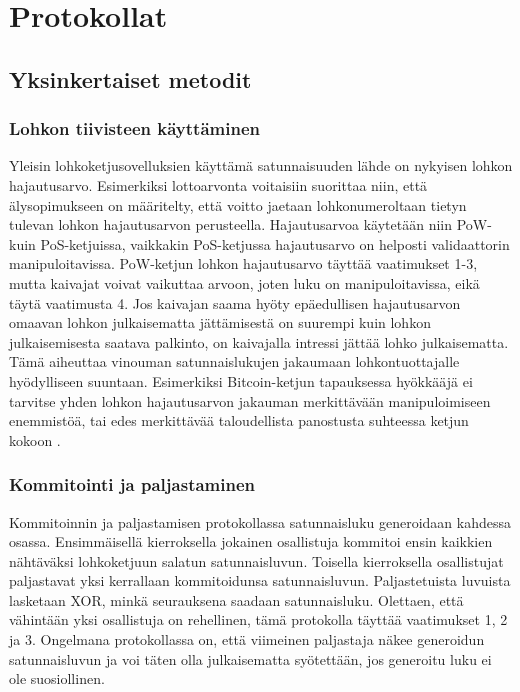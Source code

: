 \chapter{Protokollat\label{results}}
\section{Yksinkertaiset metodit}

\subsection{Lohkon tiivisteen käyttäminen}
Yleisin lohkoketjusovelluksien käyttämä satunnaisuuden lähde on nykyisen lohkon hajautusarvo. Esimerkiksi lottoarvonta voitaisiin suorittaa niin, että älysopimukseen on määritelty, että voitto jaetaan lohkonumeroltaan tietyn tulevan lohkon hajautusarvon perusteella. Hajautusarvoa käytetään niin PoW- kuin PoS-ketjuissa, vaikkakin PoS-ketjussa hajautusarvo on helposti validaattorin manipuloitavissa. PoW-ketjun lohkon hajautusarvo täyttää vaatimukset 1-3, mutta kaivajat voivat vaikuttaa arvoon, joten luku on manipuloitavissa, eikä täytä vaatimusta 4. Jos kaivajan saama hyöty epäedullisen hajautusarvon omaavan lohkon julkaisematta jättämisestä on suurempi kuin lohkon julkaisemisesta saatava palkinto, on kaivajalla intressi jättää lohko julkaisematta. Tämä aiheuttaa vinouman satunnaislukujen jakaumaan lohkontuottajalle hyödylliseen suuntaan. Esimerkiksi Bitcoin-ketjun tapauksessa hyökkääjä ei tarvitse yhden lohkon hajautusarvon jakauman merkittävään manipuloimiseen enemmistöä, tai edes merkittävää taloudellista panostusta suhteessa ketjun kokoon \cite{pierrot_malleability_2018}.

\subsection{Kommitointi ja paljastaminen}
Kommitoinnin ja paljastamisen protokollassa satunnaisluku generoidaan kahdessa osassa. Ensimmäisellä kierroksella jokainen osallistuja kommitoi ensin kaikkien nähtäväksi lohkoketjuun salatun satunnaisluvun. Toisella kierroksella osallistujat paljastavat yksi kerrallaan kommitoidunsa satunnaisluvun. Paljastetuista luvuista lasketaan XOR, minkä seurauksena saadaan satunnaisluku. Olettaen, että vähintään yksi osallistuja on rehellinen, tämä protokolla täyttää vaatimukset 1, 2 ja 3. Ongelmana protokollassa on, että viimeinen paljastaja näkee generoidun satunnaisluvun ja voi täten olla julkaisematta syötettään, jos generoitu luku ei ole suosiollinen.

